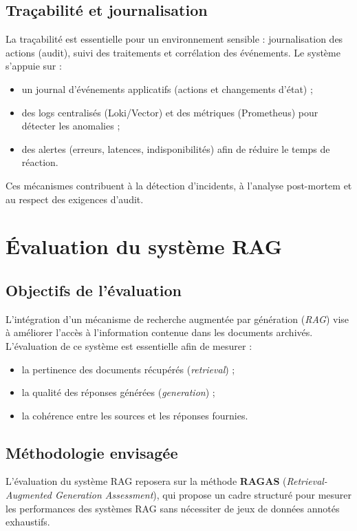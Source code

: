 \documentclass[12pt,a4paper]{report}
\begin{document}
\section{Traçabilité et journalisation}
La traçabilité est essentielle pour un environnement sensible : journalisation des actions (audit), suivi des traitements et corrélation des événements. Le système s’appuie sur :
\begin{itemize}
  \item un journal d’événements applicatifs (actions et changements d’état) ;
  \item des logs centralisés (Loki/Vector) et des métriques (Prometheus) pour détecter les anomalies ;
  \item des alertes (erreurs, latences, indisponibilités) afin de réduire le temps de réaction.
\end{itemize}
Ces mécanismes contribuent à la détection d’incidents, à l’analyse post-mortem et au respect des exigences d’audit.

\chapter{Évaluation du système RAG}
\section{Objectifs de l’évaluation}
L’intégration d’un mécanisme de recherche augmentée par génération (\textit{RAG}) vise à améliorer l’accès à l’information contenue dans les documents archivés. L’évaluation de ce système est essentielle afin de mesurer :
\begin{itemize}
  \item la pertinence des documents récupérés (\textit{retrieval}) ;
  \item la qualité des réponses générées (\textit{generation}) ;
  \item la cohérence entre les sources et les réponses fournies.
\end{itemize}

\section{Méthodologie envisagée}
L’évaluation du système RAG reposera sur la méthode \textbf{RAGAS} (\textit{Retrieval-Augmented Generation Assessment}), qui propose un cadre structuré pour mesurer les performances des systèmes RAG sans nécessiter de jeux de données annotés exhaustifs.
\end{document}
